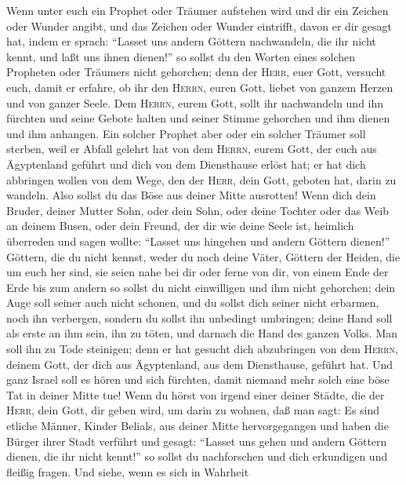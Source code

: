  Wenn unter euch ein Prophet oder Träumer aufstehen wird
und dir ein Zeichen oder Wunder angibt,  und das Zeichen
oder Wunder eintrifft, davon er dir gesagt hat, indem er sprach:
``Lasset uns andern Göttern nachwandeln, die ihr nicht kennt, und laßt
uns ihnen dienen!''  so sollst du den Worten eines solchen
Propheten oder Träumers nicht gehorchen; denn der \textsc{Herr}, euer
Gott, versucht euch, damit er erfahre, ob ihr den \textsc{Herrn}, euren
Gott, liebet von ganzem Herzen und von ganzer Seele.  Dem
\textsc{Herrn}, eurem Gott, sollt ihr nachwandeln und ihn fürchten und
seine Gebote halten und seiner Stimme gehorchen und ihm dienen und ihm
anhangen.  Ein solcher Prophet aber oder ein solcher
Träumer soll sterben, weil er Abfall gelehrt hat von dem \textsc{Herrn},
eurem Gott, der euch aus Ägyptenland geführt und dich von dem
Diensthause erlöst hat; er hat dich abbringen wollen von dem Wege, den
der \textsc{Herr}, dein Gott, geboten hat, darin zu wandeln. Also sollst
du das Böse aus deiner Mitte ausrotten!  Wenn dich dein
Bruder, deiner Mutter Sohn, oder dein Sohn, oder deine Tochter oder das
Weib an deinem Busen, oder dein Freund, der dir wie deine Seele ist,
heimlich überreden und sagen wollte:  ``Lasset uns
hingehen und andern Göttern dienen!'' Göttern, die du nicht kennst,
weder du noch deine Väter, Göttern der Heiden, die um euch her sind, sie
seien nahe bei dir oder ferne von dir, von einem Ende der Erde bis zum
andern  so sollst du nicht einwilligen und ihm nicht
gehorchen; dein Auge soll seiner auch nicht schonen, und du sollst dich
seiner nicht erbarmen, noch ihn verbergen,  sondern du
sollst ihn unbedingt umbringen; deine Hand soll als erste an ihm sein,
ihn zu töten, und darnach die Hand des ganzen Volks.  Man
soll ihn zu Tode steinigen; denn er hat gesucht dich abzubringen von dem
\textsc{Herrn}, deinem Gott, der dich aus Ägyptenland, aus dem
Diensthause, geführt hat.  Und ganz Israel soll es hören
und sich fürchten, damit niemand mehr solch eine böse Tat in deiner
Mitte tue!  Wenn du hörst von irgend einer deiner Städte,
die der \textsc{Herr}, dein Gott, dir geben wird, um darin zu wohnen,
daß man sagt:  Es sind etliche Männer, Kinder Belials,
aus deiner Mitte hervorgegangen und haben die Bürger ihrer Stadt
verführt und gesagt: ``Lasset uns gehen und andern Göttern dienen, die
ihr nicht kennt!''  so sollst du nachforschen und dich
erkundigen und fleißig fragen. Und siehe, wenn es sich in Wahrheit
